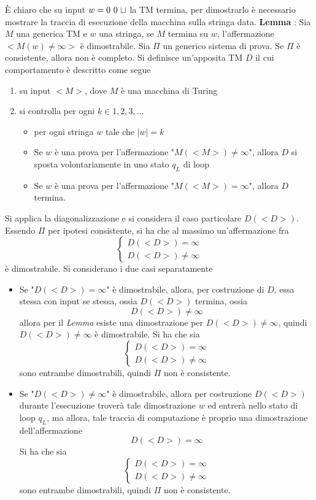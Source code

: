 \documentclass[10pt, letterpaper]{report}
\begin{document}
È chiaro che su input $w=0 \ 0\ \blank$ la TM termina, per dimostrarlo è necessario mostrare la traccia di esecuzione della macchina sulla stringa data.\acc 
\color{sapienza}\textbf{Lemma} : \color{black} Sia $M$ una generica TM e $w$ una stringa, se $M$ termina su $w$, l'affermazione $<M(w)\ne \infty>$ è dimostrabile.\acc 
{} Sia $\Pi$ un generico sistema di prova. Se $\Pi$ è consistente, allora non è completo.\acc 
\dimo{} Si definisce un'apposita TM $D$ il cui comportamento è descritto come segue \begin{enumerate}
    \item su input $<M>$, dove $M$ è una macchina di Turing 
    \item si controlla per ogni $k\in1,2,3,\dots$\begin{itemize}
        \item per ogni stringa $w$ tale che $|w|=k$
        \item Se $w$ è una prova per l'affermazione "$M(<M>)\ne \infty$", allora $D$ si sposta volontariamente in uno stato $q_L$ di loop  
        \item Se $w$ è una prova per l'affermazione "$M(<M>)=\infty$", allora $D$ termina. 
    \end{itemize}
\end{enumerate}
Si applica la diagonalizzazione e si considera il caso particolare $D(<D>)$. Essendo $\Pi$ per ipotesi consistente, si ha che al massimo un'affermazione  fra $$ \begin{cases}
    D(<D>)=\infty\\ 
    D(<D>)\ne \infty
\end{cases}$$
è dimostrabile. Si considerano i due casi separatamente\begin{itemize}
    \item Se "$D(<D>)=\infty$" è dimostrabile, allora, per costruzione di $D$, essa stessa con input se stessa, ossia $D(<D>)$ termina, ossia $$D(<D>)\ne\infty$$ allora per il \textit{Lemma} esiste una dimostrazione per $D(<D>)\ne\infty$, quindi $D(<D>)\ne\infty$ è dimostrabile. Si ha che sia 
    $$ \begin{cases}
    D(<D>)=\infty\\ 
    D(<D>)\ne \infty
\end{cases}$$
sono entrambe dimostrabili, quindi $\Pi$ non è consistente.
    \item Se "$D(<D>)\ne\infty$" è dimostrabile, allora per costruzione $D(<D>)$ durante l'esecuzione troverà tale dimostrazione $w$ ed entrerà nello stato di loop $q_L$, ma allora, tale traccia di computazione è proprio una dimostrazione dell'affermazione 
    $$D(<D>)=\infty $$
    Si ha che sia 
    $$ \begin{cases} 
    D(<D>)=\infty\\ 
    D(<D>)\ne \infty
\end{cases}$$
sono entrambe dimostrabili, quindi $\Pi$ non è consistente.  
\end{itemize}
\end{document}
